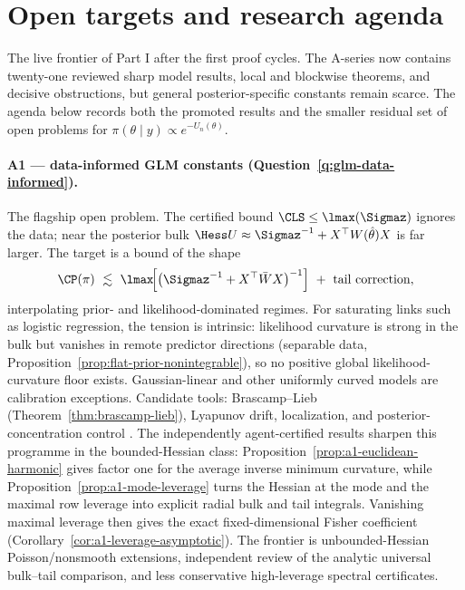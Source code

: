 \documentclass[../main.tex]{subfiles}
\begin{document}
\section{Open targets and research agenda}
\label{sec:agenda}

The live frontier of Part I after the first proof cycles. The A-series now contains twenty-one reviewed sharp
model results, local and blockwise theorems, and decisive obstructions, but general
posterior-specific constants remain scarce. The agenda below records both the promoted results and
the smaller residual set of open problems for
$\pi(\theta\mid y)\propto e^{-U_n(\theta)}$.

\paragraph{A1 --- data-informed GLM constants (Question~\ref{q:glm-data-informed}).}
The flagship open problem. The certified bound $\CLS\le\lmax(\Sigmaz)$ ignores the data;
near the posterior bulk $\Hess U\approx\Sigmaz^{-1}+X^\top W(\hat\theta)X$ is far larger.
The target is a bound of the shape
\[
  \CP(\pi)\ \lesssim\ \lmax\!\Big[\big(\Sigmaz^{-1}+X^\top\bar W X\big)^{-1}\Big]
  \ +\ \text{tail correction},
\]
interpolating prior- and likelihood-dominated regimes. For saturating links such as logistic
regression, the tension is intrinsic: likelihood curvature is strong in the bulk but vanishes in
remote predictor directions (separable data, Proposition~\ref{prop:flat-prior-nonintegrable}), so
no positive global likelihood-curvature floor exists. Gaussian-linear and other uniformly curved
models are calibration exceptions.
Candidate tools: Brascamp--Lieb (Theorem~\ref{thm:brascamp-lieb}), Lyapunov drift,
localization, and posterior-concentration control
\cite{BakryCattiauxGuillin2008,CattiauxGuillinWangWu2009,cattiaux2018poincare}.
The independently agent-certified results sharpen this programme in the bounded-Hessian class:
Proposition~\ref{prop:a1-euclidean-harmonic} gives factor one for the average inverse minimum
curvature, while Proposition~\ref{prop:a1-mode-leverage} turns the Hessian at the mode and the
maximal row leverage into explicit radial bulk and tail integrals.  Vanishing maximal leverage
then gives the exact fixed-dimensional Fisher coefficient
(Corollary~\ref{cor:a1-leverage-asymptotic}).  The frontier is unbounded-Hessian
Poisson/nonsmooth extensions, independent review of the analytic universal bulk--tail comparison, and less
conservative high-leverage spectral certificates.
\end{document}
